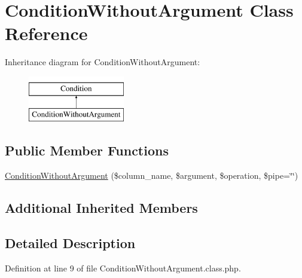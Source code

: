 \hypertarget{classConditionWithoutArgument}{\section{Condition\-Without\-Argument Class Reference}
\label{classConditionWithoutArgument}
}
Inheritance diagram for Condition\-Without\-Argument\-:\begin{figure}[H]
\begin{center}
\leavevmode
\includegraphics[height=2.000000cm]{classConditionWithoutArgument}
\end{center}
\end{figure}
\subsection*{Public Member Functions}
\begin{DoxyCompactItemize}
\item 
\hyperlink{classConditionWithoutArgument_a42d42e70c74111b4980e2916b64c95e7}{Condition\-Without\-Argument} (\$column\-\_\-name, \$argument, \$operation, \$pipe=\char`\"{}\char`\"{})
\end{DoxyCompactItemize}
\subsection*{Additional Inherited Members}


\subsection{Detailed Description}


Definition at line 9 of file Condition\-Without\-Argument.\-class.\-php.



